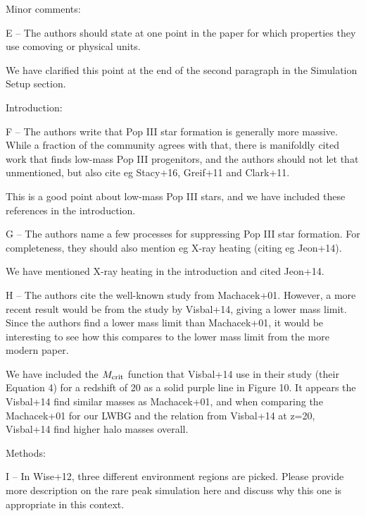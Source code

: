 \documentclass[11pt]{article}
\newenvironment{referee}[1][]{%
    \ignorespaces%
    \begin{mdframed}[style=myquotestyle,#1]%
}{%
    \end{mdframed}%
    \ignorespacesafterend%
}%
\begin{document}
\begin{referee}
Minor comments:

E -- The authors should state at one point in the paper for which properties they use comoving or physical units.
\end{referee}
We have clarified this point at the end of the second paragraph in the Simulation Setup section.

\begin{referee}
Introduction:

F -- The authors write that Pop III star formation is generally more massive. While a fraction of the community agrees with that, there is manifoldly cited work that finds low-mass Pop III progenitors, and the authors should not let that unmentioned, but also cite eg Stacy+16, Greif+11 and Clark+11.
\end{referee}

This is a good point about low-mass Pop III stars, and we have included these references in the introduction.

\begin{referee}
G -- The authors name a few processes for suppressing Pop III star formation. For completeness, they should also mention eg X-ray heating (citing eg Jeon+14).
\end{referee}

We have mentioned X-ray heating in the introduction and cited Jeon+14.

\begin{referee}
H -- The authors cite the well-known study from Machacek+01. However, a more recent result would be from the study by Visbal+14, giving a lower mass limit. Since the authors find a lower mass limit than Machacek+01, it would be interesting to see how this compares to the lower mass limit from the more modern paper.
\end{referee}
We have included the $M_{\rm crit}$ function that Visbal+14 use in their study (their Equation 4) for a redshift of 20 as a solid purple line in Figure 10. It appears the Visbal+14 find similar masses as Machacek+01, and when comparing the Machacek+01 for our LWBG and the relation from Visbal+14 at z=20, Visbal+14 find higher halo masses overall.

\begin{referee}
Methods:

I -- In Wise+12, three different environment regions are picked. Please provide more description on the rare peak simulation here and discuss why this one is appropriate in this context.
\end{referee}
\end{document}
